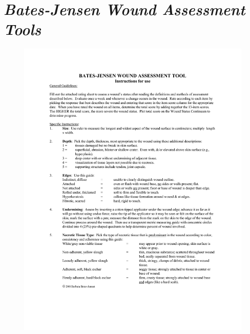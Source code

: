 \chapter{\emph{Bates-Jensen Wound Assessment Tools}}

\begin{figure}[H]
	\centering
	\includegraphics[keepaspectratio, width=14cm]{gambar/BWAT-1}
	\label{gambar:bwat_1}
\end{figure}

